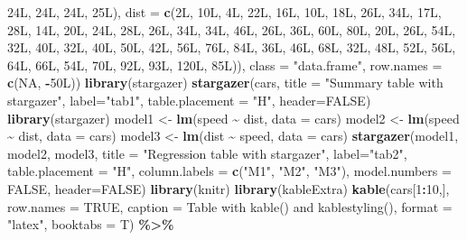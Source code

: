 \documentclass[
  12pt,
]{article}
\newenvironment{Shaded}{\begin{snugshade}}{\end{snugshade}}
\newcommand{\AttributeTok}[1]{\textcolor[rgb]{0.13,0.29,0.53}{#1}}
\newcommand{\ConstantTok}[1]{\textcolor[rgb]{0.56,0.35,0.01}{#1}}
\newcommand{\DecValTok}[1]{\textcolor[rgb]{0.00,0.00,0.81}{#1}}
\newcommand{\FunctionTok}[1]{\textcolor[rgb]{0.13,0.29,0.53}{\textbf{#1}}}
\newcommand{\NormalTok}[1]{#1}
\newcommand{\OtherTok}[1]{\textcolor[rgb]{0.56,0.35,0.01}{#1}}
\newcommand{\SpecialCharTok}[1]{\textcolor[rgb]{0.81,0.36,0.00}{\textbf{#1}}}
\newcommand{\StringTok}[1]{\textcolor[rgb]{0.31,0.60,0.02}{#1}}
\begin{document}
\begin{Shaded}
\begin{Highlighting}[]
\NormalTok{24L, 24L, 24L, 25L), }\AttributeTok{dist =} \FunctionTok{c}\NormalTok{(2L, 10L, 4L, 22L, 16L, 10L, 18L, }
\NormalTok{26L, 34L, 17L, 28L, 14L, 20L, 24L, 28L, 26L, 34L, 34L, 46L, 26L, }
\NormalTok{36L, 60L, 80L, 20L, 26L, 54L, 32L, 40L, 32L, 40L, 50L, 42L, 56L, }
\NormalTok{76L, 84L, 36L, 46L, 68L, 32L, 48L, 52L, 56L, 64L, 66L, 54L, 70L, }
\NormalTok{92L, 93L, 120L, 85L)), }
\AttributeTok{class =} \StringTok{"data.frame"}\NormalTok{, }\AttributeTok{row.names =} \FunctionTok{c}\NormalTok{(}\ConstantTok{NA}\NormalTok{, }
\SpecialCharTok{{-}}\NormalTok{50L))}
\FunctionTok{library}\NormalTok{(stargazer)}
\FunctionTok{stargazer}\NormalTok{(cars, }
          \AttributeTok{title =} \StringTok{"Summary table with stargazer"}\NormalTok{,}
          \AttributeTok{label=}\StringTok{"tab1"}\NormalTok{, }
          \AttributeTok{table.placement =} \StringTok{"H"}\NormalTok{, }
          \AttributeTok{header=}\ConstantTok{FALSE}\NormalTok{)}
\FunctionTok{library}\NormalTok{(stargazer)}
\NormalTok{model1 }\OtherTok{\textless{}{-}} \FunctionTok{lm}\NormalTok{(speed }\SpecialCharTok{\textasciitilde{}}\NormalTok{ dist, }\AttributeTok{data =}\NormalTok{ cars)}
\NormalTok{model2 }\OtherTok{\textless{}{-}} \FunctionTok{lm}\NormalTok{(speed }\SpecialCharTok{\textasciitilde{}}\NormalTok{ dist, }\AttributeTok{data =}\NormalTok{ cars)}
\NormalTok{model3 }\OtherTok{\textless{}{-}} \FunctionTok{lm}\NormalTok{(dist }\SpecialCharTok{\textasciitilde{}}\NormalTok{ speed, }\AttributeTok{data =}\NormalTok{ cars)}
\FunctionTok{stargazer}\NormalTok{(model1, model2, model3,}
          \AttributeTok{title =} \StringTok{"Regression table with stargazer"}\NormalTok{,}
          \AttributeTok{label=}\StringTok{"tab2"}\NormalTok{, }
          \AttributeTok{table.placement =} \StringTok{"H"}\NormalTok{, }
          \AttributeTok{column.labels =} \FunctionTok{c}\NormalTok{(}\StringTok{"M1"}\NormalTok{, }\StringTok{"M2"}\NormalTok{, }\StringTok{"M3"}\NormalTok{),}
          \AttributeTok{model.numbers =} \ConstantTok{FALSE}\NormalTok{,}
          \AttributeTok{header=}\ConstantTok{FALSE}\NormalTok{)}
\FunctionTok{library}\NormalTok{(knitr)}
\FunctionTok{library}\NormalTok{(kableExtra)}
\FunctionTok{kable}\NormalTok{(cars[}\DecValTok{1}\SpecialCharTok{:}\DecValTok{10}\NormalTok{,], }\AttributeTok{row.names =} \ConstantTok{TRUE}\NormalTok{, }
      \AttributeTok{caption =} \StringTok{\textquotesingle{}Table with kable() and kablestyling()\textquotesingle{}}\NormalTok{, }
      \AttributeTok{format =} \StringTok{"latex"}\NormalTok{, }\AttributeTok{booktabs =}\NormalTok{ T) }\SpecialCharTok{\%\textgreater{}\%}

\end{Highlighting}
\end{Shaded}
\end{document}
